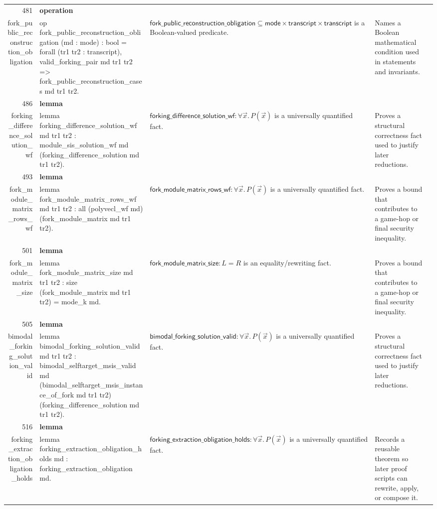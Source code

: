 \documentclass[10pt]{article}
\newcommand{\ec}[1]{\begingroup\ttfamily\scriptsize #1\endgroup}
\begin{document}
\begin{longtable}{r L{0.17\textwidth} L{0.26\textwidth} L{0.27\textwidth} L{0.20\textwidth}}
481 & \textbf{operation}\\\ec{fork\_public\_reconstruction\_obligation} & \ec{op fork\_public\_reconstruction\_obligation (md : mode) : bool = forall (tr1 tr2 : transcript), valid\_forking\_pair md tr1 tr2 => fork\_public\_reconstruction\_cases md tr1 tr2.} & \(\mathsf{fork\_public\_reconstruction\_obligation} \subseteq \mathsf{mode} \times \mathsf{transcript} \times \mathsf{transcript}\) is a Boolean-valued predicate. & Names a Boolean mathematical condition used in statements and invariants. \\
486 & \textbf{lemma}\\\ec{forking\_difference\_solution\_wf} & \ec{lemma forking\_difference\_solution\_wf md tr1 tr2 : module\_sis\_solution\_wf md (forking\_difference\_solution md tr1 tr2).} & \(\mathsf{forking\_difference\_solution\_wf} : \forall \vec{x}.\, P(\vec{x})\) is a universally quantified fact. & Proves a structural correctness fact used to justify later reductions. \\
493 & \textbf{lemma}\\\ec{fork\_module\_matrix\_rows\_wf} & \ec{lemma fork\_module\_matrix\_rows\_wf md tr1 tr2 : all (polyvecl\_wf md) (fork\_module\_matrix md tr1 tr2).} & \(\mathsf{fork\_module\_matrix\_rows\_wf} : \forall \vec{x}.\, P(\vec{x})\) is a universally quantified fact. & Proves a bound that contributes to a game-hop or final security inequality. \\
501 & \textbf{lemma}\\\ec{fork\_module\_matrix\_size} & \ec{lemma fork\_module\_matrix\_size md tr1 tr2 : size (fork\_module\_matrix md tr1 tr2) = mode\_k md.} & \(\mathsf{fork\_module\_matrix\_size} : L = R\) is an equality/rewriting fact. & Proves a bound that contributes to a game-hop or final security inequality. \\
505 & \textbf{lemma}\\\ec{bimodal\_forking\_solution\_valid} & \ec{lemma bimodal\_forking\_solution\_valid md tr1 tr2 : bimodal\_selftarget\_msis\_valid md (bimodal\_selftarget\_msis\_instance\_of\_fork md tr1 tr2) (forking\_difference\_solution md tr1 tr2).} & \(\mathsf{bimodal\_forking\_solution\_valid} : \forall \vec{x}.\, P(\vec{x})\) is a universally quantified fact. & Proves a structural correctness fact used to justify later reductions. \\
516 & \textbf{lemma}\\\ec{forking\_extraction\_obligation\_holds} & \ec{lemma forking\_extraction\_obligation\_holds md : forking\_extraction\_obligation md.} & \(\mathsf{forking\_extraction\_obligation\_holds} : \forall \vec{x}.\, P(\vec{x})\) is a universally quantified fact. & Records a reusable theorem so later proof scripts can rewrite, apply, or compose it. \\

\end{longtable}
\end{document}
